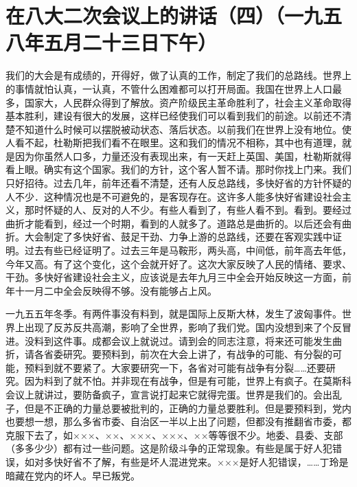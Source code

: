\section[在八大二次会议上的讲话（四）（一九五八年五月二十三日下午）]{在八大二次会议上的讲话（四）（一九五八年五月二十三日下午）}


我们的大会是有成绩的，开得好，做了认真的工作，制定了我们的总路线。世界上的事情就怕认真，一认真，不管什么困难都可以打开局面。我国在世界上人口最多，国家大，人民群众得到了解放。资产阶级民主革命胜利了，社会主义革命取得基本胜利，建设有很大的发展，这样已经使我们可以看到我们的前途。以前还不清楚不知道什么时候可以摆脱被动状态、落后状态。以前我们在世界上没有地位。使人看不起，杜勒斯把我们看不在眼里。这和我们的情况不相称，其中也有道理，就是因为你虽然人口多，力量还没有表现出来，有一天赶上英国、美国，杜勒斯就得看上眼。确实有这个国家。我们的方针，这个客人暂不请。那时你找上门来。我们只好招待。过去几年，前年还看不清楚，还有人反总路线，多快好省的方针怀疑的人不少．这种情况也是不可避免的，是客现存在。这许多人能多快好省建设社会主义，那时怀疑的人、反对的人不少。有些人看到了，有些人看不到。看到。要经过曲折才能看到，经过一个时期，看到的人就多了。道路总是曲折的。以后还会有曲折。大会制定了多快好省、鼓足干劲、力争上游的总路线，还要在客观实践中证明。过去有些已经证明了。过去三年是马鞍形，两头高，中间低，前年高去年低，今年又高。有了这个变化，这个会就开好了。这次大家反映了人民的情绪、要求、干劲。多快好省建设社会主义，应该说是去年九月三中全会开始反映这一方面，前年十一月二中全会反映得不够。没有能够占上风。

一九五五年冬季。有两件事没有料到，就是国际上反斯大林，发生了波匈事件。世界上出现了反苏反共高潮，影响了全世界，影响了我们党。国内没想到来了个反冒进。没料到这件事。成都会议上就说过。请到会的同志注意，将来还可能发生曲折，请各省委研究。要预料到，前次在大会上讲了，有战争的可能、有分裂的可能，预料到就不要紧了。大家要研究一下，各省对可能有战争有分裂……还要研究。因为料到了就不怕。并非现在有战争，但是有可能，世界上有疯子。在莫斯科会议上就讲过，要防备疯子，宣言说打起来它就得完蛋。世界是我们的。会出乱子，但是不正确的力量总要被批判的，正确的力量总要胜利。但是要预料到，党内也要想一想，那么多省市委、自治区一半以上出了问题，但都没有推翻省市委，都克服下去了，如×××、××、×××、×××、××等等很不少。地委、县委、支部（多多少少）都有过一些问题。这是阶级斗争的正常现象。有些是属于好人犯错误，如对多快好省不了解，有些是坏人混进党来。×××是好人犯错误，……丁玲是暗藏在党内的坏人。早已叛党。

